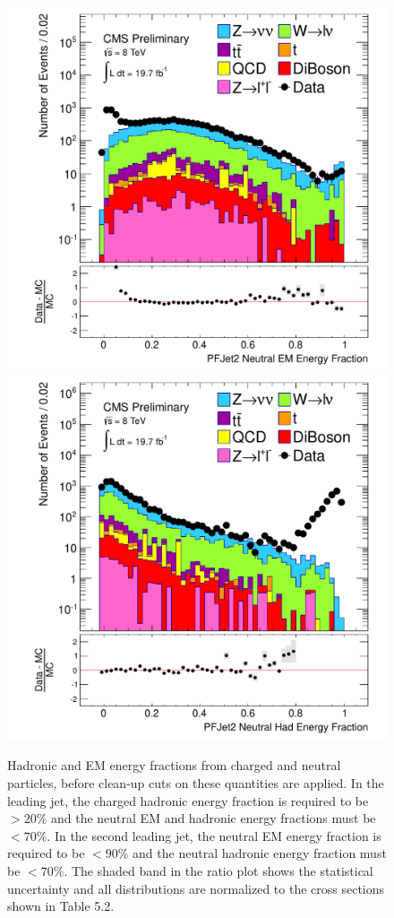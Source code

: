 \begin{figure}[!Hhtb]
\begin{center}
  \includegraphics[scale=0.31]     {Figures/sus13009/nocut/prelimLabels/PFAK5JetNeuEmEngFrac2.pdf}
  \includegraphics[scale=0.31]     {Figures/sus13009/nocut/prelimLabels/PFAK5JetNeuHadEngFrac2.pdf}
  \caption{Hadronic and EM energy fractions from charged 
and neutral particles, before clean-up cuts on these quantities are 
applied. 
In the leading jet, the charged hadronic energy fraction is required to be $>20\%$ and the neutral EM and hadronic energy fractions must be $<70\%$.
In the second leading jet, the neutral EM energy fraction is required to be $<90\%$ and the 
neutral hadronic energy fraction must be $<70\%$. 
The shaded band in the ratio plot shows the statistical uncertainty and all distributions are normalized to the cross sections shown in Table 5.2.
         \label{fig:ANA_energy_fraction_cleanup}}
  \end{center}
\end{figure}
